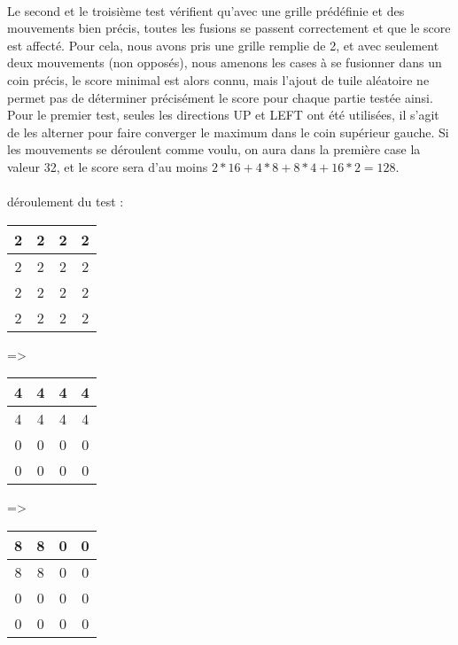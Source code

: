 \documentclass{report}
\begin{document}
\paragraph{}
Le second et le troisième test vérifient qu'avec une grille prédéfinie et des mouvements bien précis, toutes les fusions se passent correctement et que le score est affecté. Pour cela, nous avons pris une grille remplie de 2, et avec seulement deux mouvements (non opposés), nous amenons les cases à se fusionner dans un coin précis, le score minimal est alors connu, mais l'ajout de tuile aléatoire ne permet pas de déterminer précisément le score pour chaque partie testée ainsi.
Pour le premier test, seules les directions UP et LEFT ont été utilisées, il s'agit de les alterner pour faire converger le maximum dans le coin supérieur gauche. Si les mouvements se déroulent comme voulu, on aura dans la première case la valeur 32, et le score sera d'au moins $2*16 + 4*8 + 8*4 + 16*2 = 128$.

\paragraph{}déroulement du test : 
\begin{center}
\begin{tabular}{|c|c|c|c|}
  \hline
  2& 2 & 2& 2\\
  \hline
  2& 2 & 2& 2\\
  \hline
  2& 2 & 2& 2\\
  \hline
  2& 2 & 2& 2\\
  \hline
\end{tabular} =>
\begin{tabular}{|c|c|c|c|}
  \hline
 4 & 4 & 4& 4\\
  \hline
 4 & 4 & 4& 4\\
  \hline
  0& 0 & 0& 0\\
  \hline
  0 & 0 & 0 & 0 \\
  \hline
\end{tabular} =>
\begin{tabular}{|c|c|c|c|}
  \hline
  8 & 8 & 0 & 0 \\
  \hline
  8 & 8 & 0 & 0 \\
  \hline
  0 & 0 & 0 & 0 \\
  \hline
  0 & 0 & 0 & 0 \\
  \hline
\end{tabular} 
\end{center}
\end{document}
